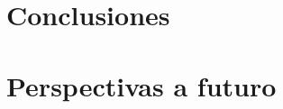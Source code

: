 \documentclass[../main.tex]{subfiles}
\begin{document}
\chapter{Conclusiones}
\chapter{Perspectivas a futuro}
\end{document}
